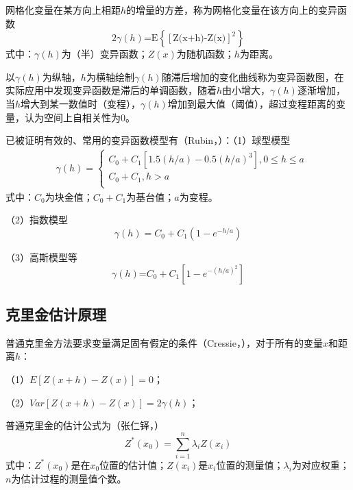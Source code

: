 网格化变量在某方向上相距$h$的增量的方差，称为网格化变量在该方向上的变异函数
\begin{equation}
    2\gamma (h)\text{=E}\left\{ {{\left[ \text{Z(x+h)-Z(x)} \right]}^{2}} \right\}
\end{equation}
式中：$\gamma (h)$为（半）变异函数；$Z(x)$为随机函数；$h$为距离。

以$\gamma (h)$为纵轴，$h$为横轴绘制$\gamma (h)$随滞后增加的变化曲线称为变异函数图，在实际应用中发现变异函数是滞后的单调函数，随着$h$由小增大，$\gamma (h)$逐渐增加，当$h$增大到某一数值时（变程），$\gamma (h)$增加到最大值（阈值），超过变程距离的变量，认为空间上自相关性为0。

已被证明有效的、常用的变异函数模型有（Rubin，\citeyear{rubin2003applied}）：（1）球型模型
\begin{align}
& \gamma (h)=\left\{ \begin{array}{*{35}{l}}
   {{C}_{0}}+{{C}_{1}}\left[ 1.5(h/a)-0.5{{(h/a)}^{3}} \right],0\le h\le a  \\
   {{C}_{0}}+{{C}_{1}},h>a  \\
\end{array} \right.
\end{align}
式中：$C_0$为块金值；$C_0+C_1$为基台值；$a$为变程。

（2）指数模型
\begin{equation}
    \gamma (h)={{C}_{0}}+{{C}_{1}}(1-{{e}^{-h/a}})
\end{equation}

（3）高斯模型等
\begin{equation}
    \gamma (h)\text{=}{{C}_{0}}+{{C}_{1}}\left[ 1-{{e}^{-{{(h/a)}^{2}}}} \right]
\end{equation}

\subsection{克里金估计原理}

普通克里金方法要求变量满足固有假定的条件（Cressie，\citeyear{cressie1988spatial}），对于所有的变量$x$和距离$h$：

（1）$E\left[ Z(x+h)-Z(x) \right]=0$；

（2）$Var\left[ Z(x+h)-Z(x) \right]=2\gamma (h)$；

普通克里金的估计公式为（张仁铎，\citeyear{张仁铎2005空间变异理论及应用}）
\begin{equation}
    {{Z}^{*}}({{x}_{0}})=\sum\limits_{i=1}^{n}{{{\lambda }_{i}}Z({{x}_{i}})}
\end{equation}
式中：${Z}^{*}(x_0)$是在$x_0$位置的估计值；$Z(x_i)$是$x_i$位置的测量值；${\lambda }_{i}$为对应权重；$n$为估计过程的测量值个数。

